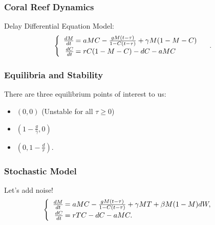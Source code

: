 \begin{frame}\frametitle{Coral Reef Dynamics}
Delay Differential Equation Model:
$$\begin{cases}
\begin{array}{rl}
\frac{dM}{dt}\hspace{-.8em}&=aMC - \frac{gM(t-\tau)}{1-C(t-\tau)} + \gamma M (1-M-C)\\
\frac{dC}{dt}\hspace{-.8em}&=rC(1-M-C) - dC - aMC\\
\end{array}
\end{cases}.$$
\end{frame}


\begin{frame}
\frametitle{Equilibria and Stability}
There are three equilibrium points of interest to us: \begin{itemize}
\item $(0,0)$ (Unstable for all $\tau\geq0$)\\
\item $(1-\frac{g}{\gamma},0)$\\
\item $(0,1-\frac{d}{r})$.
\end{itemize}
\end{frame}


\begin{frame}
\frametitle{Stochastic Model}
Let's add noise!
$$\begin{cases}
\begin{array}{rl}
\frac{dM}{dt}\hspace{-.8em}&=aMC - \frac{gM(t-\tau)}{1-C(t-\tau)}+\gamma M T+\beta M(1-M)dW,\\
\frac{dC}{dt}\hspace{-.8em}&=rTC - dC - aMC.\\
\end{array}
\end{cases}$$
\end{frame}

